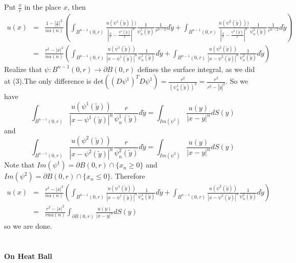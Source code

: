\documentclass[a4paper,10pt]{article}
\begin{document}
Put $\frac{x}{r}$ in the place $x$, then 
\begin{eqnarray*}
	u(x)&=&\frac{1-|\frac{x}{r}|^2}{n\alpha(n)}(\int_{B^{n-1}(0,r)}\frac{u(\psi^1(\tilde{y})))}{|\frac{x}{r}-\frac{\psi^1(\tilde{y})}{r}|^n}\frac{1}{\psi^1_n(\tilde{y})}\frac{1}{r^{n-2}}d\tilde{y}+\int_{B^{n-1}(0,r)}\frac{u(\psi^2(\tilde{y})))}{|\frac{x}{r}-\frac{\psi^2(\tilde{y})}{r}|^n}\frac{1}{\psi^2_n(\tilde{y})}\frac{1}{r^{n-2}}d\tilde{y})\\
	&=&\frac{r^2-|x|^2}{n\alpha(n)}(\int_{B^{n-1}(0,r)}\frac{u(\psi^1(\tilde{y}))}{|x-\psi^1(\tilde{y})|^n}\frac{1}{\psi^1_n(\tilde{y})}d\tilde{y}+\int_{B^{n-1}(0,r)}\frac{u(\psi^2(\tilde{y}))}{|x-\psi^2(\tilde{y})|^n}\frac{1}{\psi^2_n(\tilde{y})}d\tilde{y})
\end{eqnarray*} 
Realize that $\psi:B^{n-1}(0,r)\rightarrow\partial B(0,r)$ defines the surface integral, as we did at (3).The only difference is $\text{det}((D\psi^1)^TD\psi^1)=\frac{r^2}{(\psi^1_n(\tilde{y}))^2}=\frac{r^2}{r^2-|\tilde{y}|^2}$. So we have
$$\int_{B^{n-1}(0,r)}\frac{u(\psi^1(\tilde{y}))}{|x-\psi^1(\tilde{y})|^n}\frac{r}{\psi^1_n(\tilde{y})}d\tilde{y}=\int_{Im(\psi^1)}\frac{u(y)}{|x-y|^n}dS(y)$$ and $$ \int_{B^{n-1}(0,r)}\frac{u(\psi^2(\tilde{y}))}{|x-\psi^2(\tilde{y})|^n}\frac{r}{\psi^2_n(\tilde{y})}d\tilde{y}=\int_{Im(\psi^2)}\frac{u(y)}{|x-y|^n}dS(y)$$
Note that $Im(\psi^1)=\partial B(0,r)\cap \{x_n\geq 0\}$ and $Im(\psi^2)=\partial B(0,r)\cap \{x_n\leq 0\}$.  Therefore
\begin{eqnarray*}
	u(x)&=&\frac{r^2-|x|^2}{n\alpha(n)}(\int_{B^{n-1}(0,r)}\frac{u(\psi^1(\tilde{y}))}{|x-\psi^1(\tilde{y})|^n}\frac{1}{\psi^1_n(\tilde{y})}d\tilde{y}+\int_{B^{n-1}(0,r)}\frac{u(\psi^2(\tilde{y}))}{|x-\psi^2(\tilde{y})|^n}\frac{1}{\psi^2_n(\tilde{y})}d\tilde{y})\\
	&=&\frac{r^2-|x|^2}{rn\alpha(n)}\int_{\partial B(0,r)}\frac{u(y)}{|x-y|^n}dS(y) 
\end{eqnarray*}  
so we are done. \\ \\ \\

	
	
	
	
	
	
	
\textbf{On Heat Ball} \\ 
\end{document}
